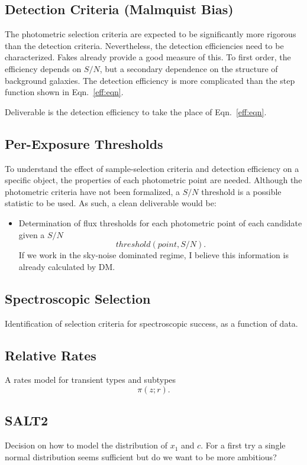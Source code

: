 \documentclass[preprint,3p]{elsarticle}
\begin{document}
\subsection{Detection Criteria (Malmquist Bias)}
The photometric selection criteria are expected to be significantly more rigorous than
the detection criteria.  Nevertheless, the detection efficiencies need to be characterized.
Fakes already provide a good measure of this.  To first order, the efficiency depends
on $S/N$, but a secondary dependence on the structure of background galaxies.
The detection efficiency is more complicated than the step function
shown in Eqn.~\ref{eff:eqn}.

Deliverable is the detection efficiency to take the place of Eqn.~\ref{eff:eqn}.

\subsection{Per-Exposure Thresholds}
To understand the effect of sample-selection criteria and detection efficiency
on a specific object, the
properties of each photometric point are needed.  Although the photometric criteria
have not been formalized, a $S/N$ threshold is a possible statistic to be used.
As such, a clean deliverable would be:
\begin{itemize}
\item Determination of flux thresholds for each photometric point of each candidate
given
a $S/N$
\begin{equation}
threshold(point, S/N).
\end{equation}
If we work in the sky-noise dominated regime, I believe this information is already
calculated by DM.
\end{itemize}

\subsection{Spectroscopic Selection}
Identification of selection criteria for spectroscopic success, as a function
of data.

\subsection{Relative Rates}
\label{rates:sec}
A rates model for transient types and subtypes
\begin{equation}
\pi(z;r).
\end{equation}
\subsection{SALT2}
Decision on how to model the distribution of $x_1$ and $c$.  For a first try a
single normal distribution seems sufficient but do we want to be more ambitious?
\end{document}
